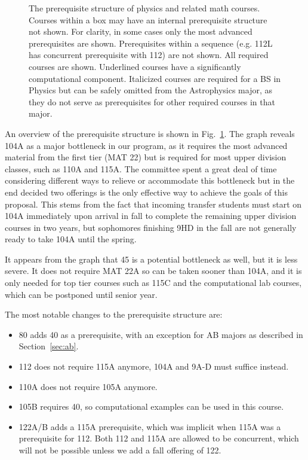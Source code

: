\documentclass[12pt]{article}
\begin{document}
\begin{figure}
\begin{center}
\begin{tikzpicture}
\end{tikzpicture}

\caption{\label{fig:prereqs} The prerequisite structure of physics and
  related math courses.  Courses within a box may have an internal
  prerequisite structure not shown.  For clarity, in some cases only
  the most advanced prerequisites are shown.  Prerequisites within a
  sequence (e.g. 112L has concurrent prerequisite with 112) are not
  shown.  All required courses are shown.  Underlined courses have a
  significantly computational component.  Italicized courses are
  required for a BS in Physics but can be safely omitted from the
  Astrophysics major, as they do not serve as prerequisites for other
  required courses in that major.}
\end{center}
\end{figure}

An overview of the prerequisite structure is shown in
Fig.~\ref{fig:prereqs}.  The graph reveals 104A as a major bottleneck
in our program, as it requires the most advanced material from the
first tier (MAT 22) but is required for most upper division classes,
such as 110A and 115A.  The committee spent a great deal of time
considering different ways to relieve or accommodate this bottleneck
but in the end decided two offerings is the only effective way to
achieve the goals of this proposal.  This stems from the fact that
incoming transfer students must start on 104A immediately upon arrival
in fall to complete the remaining upper division courses in two years,
but sophomores finishing 9HD in the fall are not generally ready to
take 104A until the spring.

It appears from the graph that 45 is a potential bottleneck as well,
but it is less severe.  It does not require MAT 22A so can be taken
sooner than 104A, and it is only needed for top tier courses such as
115C and the computational lab courses, which can be postponed until
senior year.

The most notable changes to the prerequisite structure are:
\begin{itemize}
\item 80 adds 40 as a prerequisite, with an exception for AB majors as described in Section~\ref{sec:ab}.
\item 112 does not require 115A anymore, 104A and 9A-D must suffice instead.
\item 110A does not require 105A anymore. 
\item 105B requires 40, so computational examples can be used in this course.
\item 122A/B adds a 115A prerequisite, which was implicit when 115A was a prerequisite for 112.  Both 112 and 115A are allowed to be concurrent, which will not be possible unless we add a fall offering of 122.
\end{itemize}
\end{document}
